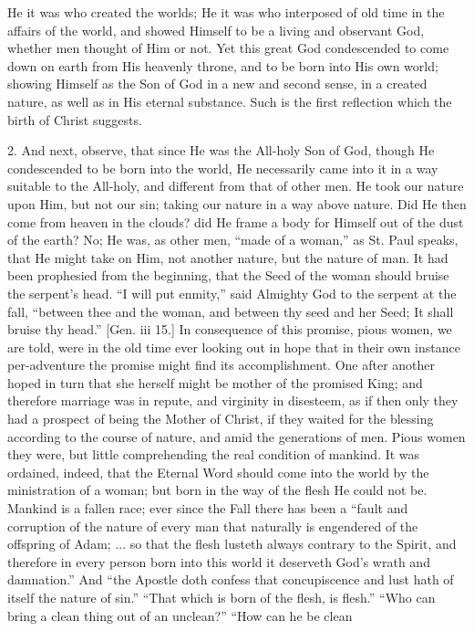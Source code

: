 He it was who created the worlds; He it was who interposed of old
time in the affairs of the world, and showed Himself to be a living
and observant God, whether men thought of Him or not. Yet this great
God condescended to come down on earth from His heavenly throne, and
to be born into His own world; showing Himself as the Son of God in a
new and second sense, in a created nature, as well as in His eternal
substance. Such is the first reflection which the birth of Christ
suggests.

2. And next, observe, that since He was the All-holy Son of God,
though He condescended to be born into the world, He necessarily came
into it in a way suitable to the All-holy, and different from that of
other men. He took our nature upon Him, but not our sin; taking our
nature in a way above nature. Did He then come from heaven in the
clouds? did He frame a body for Himself out of the dust of the earth?
No; He was, as other men, ``made of a woman,'' as St. Paul
speaks, that He might take on Him, not another nature, but the nature
of man. It had been prophesied from the beginning, that the Seed of
the woman should bruise the serpent's head. ``I will put
enmity,'' said Almighty God to the serpent at the fall,
``between thee and the woman, and between thy seed and her Seed;
It shall bruise thy head.'' [Gen. iii 15.] In consequence of this
promise, pious women, we are told, were in the old time ever looking
out in hope that in their own instance per-adventure the promise might
find its accomplishment. One after another hoped in turn that she
herself might be mother of the promised King; and therefore marriage
was in repute, and virginity in disesteem, as if then only they had a
prospect of being the Mother of Christ, if they waited for the
blessing according to the course of nature, and amid the generations
of men. Pious women they were, but little comprehending the real
condition of mankind. It was ordained, indeed, that the Eternal Word
should come into the world by the ministration of a woman; but born in
the way of the flesh He could not be. Mankind is a fallen race; ever
since the Fall there has been a ``fault and corruption of the
nature of every man that naturally is engendered of the offspring of
Adam; ... so that the flesh lusteth always contrary to the Spirit, and
therefore in every person born into this world it deserveth God's
wrath and damnation.'' And ``the Apostle doth confess that
concupiscence and lust hath of itself the nature of sin.''
``That which is born of the flesh, is flesh.'' ``Who can
bring a clean thing out of an unclean?'' ``How can he be clean
